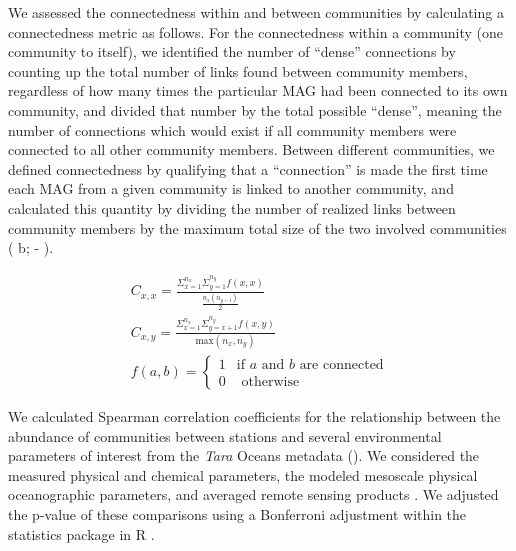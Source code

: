 \documentclass[12pt]{article}
\numberwithin{equation}{section}
\begin{document}
We assessed the connectedness within and between communities by calculating a connectedness metric as follows. For the connectedness within a community (one community to itself), we identified the number of ``dense'' connections by counting up the total number of links found between community members, regardless of how many times the particular MAG had been connected to its own community, and divided that number by the total possible ``dense'', meaning the number of connections which would exist if all community members were connected to all other community members. Between different communities, we defined connectedness by qualifying that a ``connection'' is made the first time each MAG from a given community is linked to another community, and calculated this quantity by dividing the number of realized links between community members by the maximum total size of the two involved communities ( b;  - ). 

\begin{gather}\label{eq:connect}
    C_{x,x} = \frac{\Sigma_{x=1}^{n_x} \Sigma_{y=1}^{n_y} f(x,x)}{\frac{n_x (n_{y-1})}{2}} \\
    C_{x,y} = \frac{\Sigma_{x=1}^{n_x} \Sigma_{y=x+1}^{n_y} f(x,y)}{\textrm{max}(n_x,n_y)} \\
    f(a,b) = \begin{cases}
       1 & \textrm{if } a \textrm{ and } b \textrm{ are connected} \\
       0 & \textrm{ otherwise} \label{eq:connectfinal}
    \end{cases} 
\end{gather}

We calculated Spearman correlation coefficients for the relationship between the abundance of communities between stations and several environmental parameters of interest from the \textit{Tara} Oceans metadata \citep{Pesant_2015, taraoceansconsortium2016ecoa} (). We considered the measured physical and chemical parameters, the modeled mesoscale physical oceanographic parameters, and averaged remote sensing products \citep{taraoceansconsortium2016ecoa, d_Ovidio_2010, Pesant_2015}. We adjusted the p-value of these comparisons using a Bonferroni adjustment within the statistics package in R \citep{teamr}. 
\end{document}
